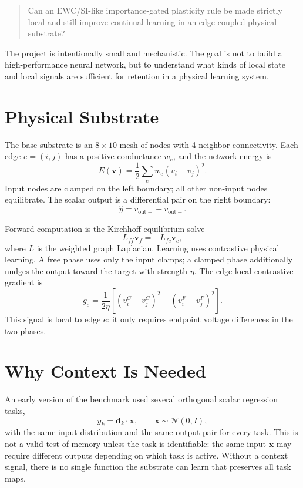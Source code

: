 \documentclass[11pt]{article}
\begin{document}
\begin{quote}
Can an EWC/SI-like importance-gated plasticity rule be made strictly
local and still improve continual learning in an edge-coupled physical
substrate?
\end{quote}

The project is intentionally small and mechanistic. The goal is not to
build a high-performance neural network, but to understand what kinds of
local state and local signals are sufficient for retention in a physical
learning system.

\section{Physical Substrate}

The base substrate is an $8 \times 10$ mesh of nodes with 4-neighbor
connectivity. Each edge $e=(i,j)$ has a positive conductance $w_e$, and
the network energy is
\[
E(\mathbf{v}) = \frac{1}{2}\sum_e w_e (v_i - v_j)^2.
\]
Input nodes are clamped on the left boundary; all other non-input nodes
equilibrate. The scalar output is a differential pair on the right
boundary:
\[
\hat{y} = v_{\mathrm{out}+} - v_{\mathrm{out}-}.
\]

Forward computation is the Kirchhoff equilibrium solve
\[
L_{ff}\mathbf{v}_f = -L_{fc}\mathbf{v}_c,
\]
where $L$ is the weighted graph Laplacian. Learning uses contrastive
physical learning. A free phase uses only the input clamps; a clamped
phase additionally nudges the output toward the target with strength
$\eta$. The edge-local contrastive gradient is
\begin{equation}
\label{eq:contrastive-gradient}
g_e =
\frac{1}{2\eta}
\left[
(v^C_i - v^C_j)^2 - (v^F_i - v^F_j)^2
\right].
\end{equation}
This signal is local to edge $e$: it only requires endpoint voltage
differences in the two phases.

\section{Why Context Is Needed}

An early version of the benchmark used several orthogonal scalar
regression tasks,
\[
y_k = \mathbf{d}_k \cdot \mathbf{x},
\qquad
\mathbf{x}\sim\mathcal{N}(0,I),
\]
with the same input distribution and the same output pair for every
task. This is not a valid test of memory unless the task is identifiable:
the same input $\mathbf{x}$ may require different outputs depending on
which task is active. Without a context signal, there is no single
function the substrate can learn that preserves all task maps.
\end{document}
